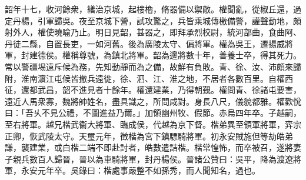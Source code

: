 \begin{pinyinscope}
韶年十七，收河餘衆，繕治京城，起樓櫓，脩器備以禦敵。權聞亂，從椒丘還，過定丹楊，引軍歸吳。夜至京城下營，試攻驚之，兵皆乘城傳檄備警，讙聲動地，頗射外人，權使曉喻乃止。明日見韶，甚器之，即拜承烈校尉，統河部曲，食曲阿、丹徒二縣，自置長吏，一如河舊。後為廣陵太守、偏將軍。權為吳王，遷揚威將軍，封建德侯。權稱尊號，為鎮北將軍。韶為邊將數十年，善養士卒，得其死力。常以警疆埸遠斥候為務，先知動靜而為之備，故鮮有負敗。青、徐、汝、沛頗來歸附，淮南濵江屯候皆撤兵遠徙，徐、泗、江、淮之地，不居者各數百里。自權西征，還都武昌，韶不進見者十餘年。權還建業，乃得朝覲。權問青、徐諸屯要害，遠近人馬衆寡，魏將帥姓名，盡具識之，所問咸對。身長八尺，儀貌都雅。權歡恱曰：「吾乆不見公禮，不圖進益乃爾。」加領幽州牧、假節。赤烏四年卒。子越嗣，至右將軍。越兄楷武衞大將軍、臨成侯，代越為京下督。楷弟異至領軍將軍，弈宗正卿，恢武陵太守。天璽元年，徵楷為宮下鎮驃騎將軍。初永安賊施但等劫皓弟謙，襲建業，或白楷二端不即赴討者，皓數遣詰楷。楷常惶怖，而卒被召，遂將妻子親兵數百人歸晉，晉以為車騎將軍，封丹楊侯。晉諸公贊曰：吳平，降為渡遼將軍，永安元年卒。吳錄曰：楷處事嚴整不如孫秀，而人聞知名，過也。


\end{pinyinscope}
